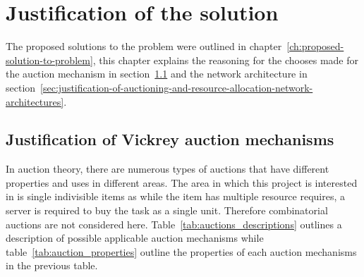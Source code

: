 \chapter{Justification of the solution}\label{ch:justification-of-the-solution}
The proposed solutions to the problem were outlined in chapter~\ref{ch:proposed-solution-to-problem}, this chapter
explains the reasoning for the chooses made for the auction mechanism in
section~\ref{sec:justification-of-vickrey-auction-mechanisms} and the network architecture in
section~\ref{sec:justification-of-auctioning-and-resource-allocation-network-architectures}.

\section{Justification of Vickrey auction mechanisms}\label{sec:justification-of-vickrey-auction-mechanisms}
In auction theory, there are numerous types of auctions that have different properties and uses in different areas.
The area in which this project is interested in is single indivisible items as while the item has multiple resource
requires, a server is required to buy the task as a single unit. Therefore combinatorial auctions are not considered
here. Table~\ref{tab:auctions_descriptions} outlines a description of possible applicable auction mechanisms while
table~\ref{tab:auction_properties} outline the properties of each auction mechanisms in the previous table.

